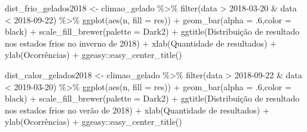 \documentclass[
]{article}
\newenvironment{Shaded}{\begin{snugshade}}{\end{snugshade}}
\newcommand{\AttributeTok}[1]{\textcolor[rgb]{0.77,0.63,0.00}{#1}}
\newcommand{\DecValTok}[1]{\textcolor[rgb]{0.00,0.00,0.81}{#1}}
\newcommand{\FunctionTok}[1]{\textcolor[rgb]{0.00,0.00,0.00}{#1}}
\newcommand{\NormalTok}[1]{#1}
\newcommand{\OtherTok}[1]{\textcolor[rgb]{0.56,0.35,0.01}{#1}}
\newcommand{\SpecialCharTok}[1]{\textcolor[rgb]{0.00,0.00,0.00}{#1}}
\newcommand{\StringTok}[1]{\textcolor[rgb]{0.31,0.60,0.02}{#1}}
\begin{document}
\begin{Shaded}
\begin{Highlighting}[]
\NormalTok{dist\_frio\_gelados2018 }\OtherTok{\textless{}{-}}\NormalTok{ climao\_gelado }\SpecialCharTok{\%\textgreater{}\%} 
  \FunctionTok{filter}\NormalTok{(data }\SpecialCharTok{\textgreater{}} \StringTok{\textquotesingle{}2018{-}03{-}20\textquotesingle{}} \SpecialCharTok{\&}\NormalTok{ data }\SpecialCharTok{\textless{}} \StringTok{\textquotesingle{}2018{-}09{-}22\textquotesingle{}}\NormalTok{) }\SpecialCharTok{\%\textgreater{}\%}
  \FunctionTok{ggplot}\NormalTok{(}\FunctionTok{aes}\NormalTok{(n, }\AttributeTok{fill =}\NormalTok{ res)) }\SpecialCharTok{+} 
  \FunctionTok{geom\_bar}\NormalTok{(}\AttributeTok{alpha =}\NormalTok{ .}\DecValTok{6}\NormalTok{,}\AttributeTok{color =} \StringTok{\textquotesingle{}black\textquotesingle{}}\NormalTok{) }\SpecialCharTok{+} 
  \FunctionTok{scale\_fill\_brewer}\NormalTok{(}\AttributeTok{palette =} \StringTok{\textquotesingle{}Dark2\textquotesingle{}}\NormalTok{) }\SpecialCharTok{+}
  \FunctionTok{ggtitle}\NormalTok{(}\StringTok{\textquotesingle{}Distribuição de resultado nos estados frios no inverno de 2018\textquotesingle{}}\NormalTok{) }\SpecialCharTok{+}
  \FunctionTok{xlab}\NormalTok{(}\StringTok{\textquotesingle{}Quantidade de resultados\textquotesingle{}}\NormalTok{) }\SpecialCharTok{+} \FunctionTok{ylab}\NormalTok{(}\StringTok{\textquotesingle{}Ocorrências\textquotesingle{}}\NormalTok{) }\SpecialCharTok{+}
\NormalTok{  ggeasy}\SpecialCharTok{::}\FunctionTok{easy\_center\_title}\NormalTok{()}

\NormalTok{dist\_calor\_gelados2018 }\OtherTok{\textless{}{-}}\NormalTok{ climao\_gelado }\SpecialCharTok{\%\textgreater{}\%} 
  \FunctionTok{filter}\NormalTok{(data }\SpecialCharTok{\textgreater{}} \StringTok{\textquotesingle{}2018{-}09{-}22\textquotesingle{}} \SpecialCharTok{\&}\NormalTok{ data }\SpecialCharTok{\textless{}} \StringTok{\textquotesingle{}2019{-}03{-}20\textquotesingle{}}\NormalTok{) }\SpecialCharTok{\%\textgreater{}\%}
  \FunctionTok{ggplot}\NormalTok{(}\FunctionTok{aes}\NormalTok{(n, }\AttributeTok{fill =}\NormalTok{ res)) }\SpecialCharTok{+} 
  \FunctionTok{geom\_bar}\NormalTok{(}\AttributeTok{alpha =}\NormalTok{ .}\DecValTok{6}\NormalTok{,}\AttributeTok{color =} \StringTok{\textquotesingle{}black\textquotesingle{}}\NormalTok{) }\SpecialCharTok{+} 
  \FunctionTok{scale\_fill\_brewer}\NormalTok{(}\AttributeTok{palette =} \StringTok{\textquotesingle{}Dark2\textquotesingle{}}\NormalTok{) }\SpecialCharTok{+}
  \FunctionTok{ggtitle}\NormalTok{(}\StringTok{\textquotesingle{}Distribuição de resultado nos estados frios no verão de 2018\textquotesingle{}}\NormalTok{) }\SpecialCharTok{+}
  \FunctionTok{xlab}\NormalTok{(}\StringTok{\textquotesingle{}Quantidade de resultados\textquotesingle{}}\NormalTok{) }\SpecialCharTok{+} \FunctionTok{ylab}\NormalTok{(}\StringTok{\textquotesingle{}Ocorrências\textquotesingle{}}\NormalTok{) }\SpecialCharTok{+}
\NormalTok{  ggeasy}\SpecialCharTok{::}\FunctionTok{easy\_center\_title}\NormalTok{() }



\end{Highlighting}
\end{Shaded}
\end{document}
